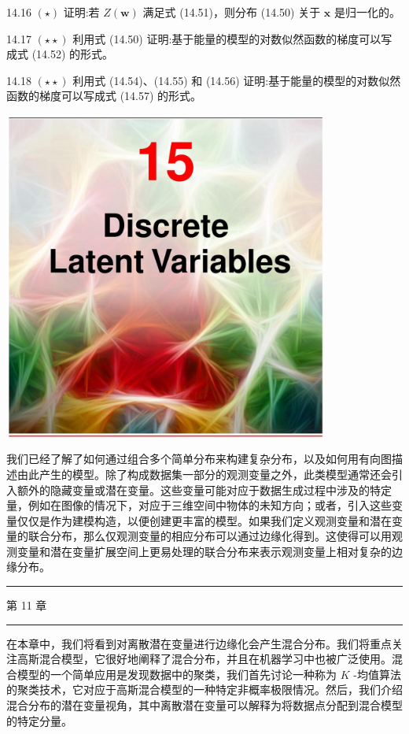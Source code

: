 \documentclass[10pt]{report}
\newcommand{\HRule}{\begin{center}\rule{0.9\linewidth}{0.2mm}\end{center}}
\begin{document}
14.16 \(\left( \star \right)\) 证明:若 \(Z\left( \mathbf{w}\right)\) 满足式 (14.51)，则分布 (14.50) 关于 \(\mathbf{x}\) 是归一化的。

14.17 \(\left( {\star  \star  }\right)\) 利用式 (14.50) 证明:基于能量的模型的对数似然函数的梯度可以写成式 (14.52) 的形式。

14.18 \(\left( {\star  \star  }\right)\) 利用式 (14.54)、(14.55) 和 (14.56) 证明:基于能量的模型的对数似然函数的梯度可以写成式 (14.57) 的形式。

\begin{center}
\includegraphics[max width=0.8\textwidth]{images/0194e279-9b28-703a-88f4-c3ac21e2010d_478_473_348_1075_1089_0.jpg}
\end{center}
\hspace*{3em} 

我们已经了解了如何通过组合多个简单分布来构建复杂分布，以及如何用有向图描述由此产生的模型。除了构成数据集一部分的观测变量之外，此类模型通常还会引入额外的隐藏变量或潜在变量。这些变量可能对应于数据生成过程中涉及的特定量，例如在图像的情况下，对应于三维空间中物体的未知方向；或者，引入这些变量仅仅是作为建模构造，以便创建更丰富的模型。如果我们定义观测变量和潜在变量的联合分布，那么仅观测变量的相应分布可以通过边缘化得到。这使得可以用观测变量和潜在变量扩展空间上更易处理的联合分布来表示观测变量上相对复杂的边缘分布。

\HRule

第 11 章

\HRule

在本章中，我们将看到对离散潜在变量进行边缘化会产生混合分布。我们将重点关注高斯混合模型，它很好地阐释了混合分布，并且在机器学习中也被广泛使用。混合模型的一个简单应用是发现数据中的聚类，我们首先讨论一种称为 \(K\) -均值算法的聚类技术，它对应于高斯混合模型的一种特定非概率极限情况。然后，我们介绍混合分布的潜在变量视角，其中离散潜在变量可以解释为将数据点分配到混合模型的特定分量。
\end{document}
